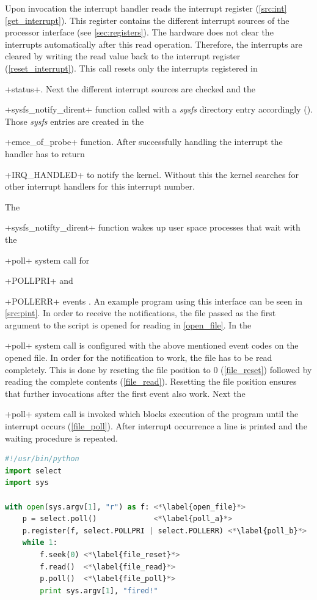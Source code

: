 \documentclass[12pt,a4paper,parskip=full,abstract=true,BCOR=12mm,twoside,open=right]{scrreprt}
\newcommand{\hack}{}
\newcommand*{\SavedLstInline}{}
\DeclareRobustCommand*{\lstinline}{%
  \ifmmode
    \let\SavedBGroup\bgroup
    \def\bgroup{%
      \let\bgroup\SavedBGroup
      \hbox\bgroup
    }%
  \fi
  \SavedLstInline
}
\def\device#1{\textit{#1}}
\begin{document}
Upon invocation the interrupt handler reads the interrupt register
(\cref{src:int} \cref{get_interrupt}). This register contains the
different interrupt sources of the processor interface (see
\cref{sec:registers}). The hardware does not clear the interrupts
automatically after this read operation. Therefore, the interrupts are cleared
by writing the read value back to the interrupt register
(\cref{reset_interrupt}). This call resets only the interrupts registered
in \lstinline+status+. Next the different interrupt sources are checked
and the \lstinline+sysfs_notify_dirent+ function called with a \device{sysfs}
directory entry accordingly (). Those
\device{sysfs} entries are created in the \lstinline+emce_of_probe+
function. After successfully handling the interrupt the handler has to
return \lstinline+IRQ_HANDLED+ to notify the kernel. Without this the
kernel searches for other interrupt handlers for this interrupt number.

The \lstinline+sysfs_notifty_dirent+ function wakes up user space processes
that wait with the \lstinline+poll+ system call for \lstinline+POLLPRI+ and
\lstinline+POLLERR+ events \cite{posix}. An example program using this interface
can be seen in \cref{src:pint}. In order to receive the notifications,
the file passed as the first argument to the script is opened for reading in
\cref{open_file}. In  the \lstinline+poll+ system call
is configured with the above mentioned event codes on the opened file. In order for
the notification to work, the file has to be read completely. This is done by
reseting the file position to 0 (\cref{file_reset}) followed by reading the
complete contents (\cref{file_read}). Resetting the file position ensures that
further invocations after the first event also work. Next the \lstinline+poll+
system call is invoked which blocks execution of the program until the
interrupt occurs (\cref{file_poll}). After interrupt occurrence a line is
printed and the waiting procedure is repeated.

\begin{lstlisting}[language=python,float=htb,caption={Wait for interrupt example in python},label=src:pint,basicstyle=\hack\scriptsize]
#!/usr/bin/python
import select
import sys

with open(sys.argv[1], "r") as f: <*\label{open_file}*>
    p = select.poll()             <*\label{poll_a}*>
    p.register(f, select.POLLPRI | select.POLLERR) <*\label{poll_b}*>
    while 1:
        f.seek(0) <*\label{file_reset}*>
        f.read()  <*\label{file_read}*>
        p.poll()  <*\label{file_poll}*>
        print sys.argv[1], "fired!"
\end{lstlisting}
\end{document}
